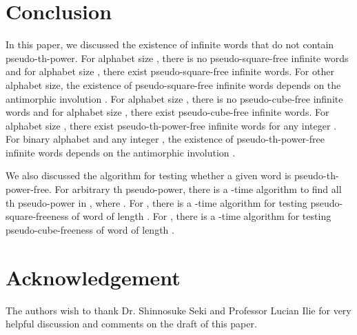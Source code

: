 \documentclass[12pt]{article}
\begin{document}
\section{Conclusion}\label{section:conclusion}
In this paper, we discussed the existence of infinite words that do
not contain pseudo-th-power. For alphabet size , there is
no pseudo-square-free infinite words and for alphabet size ,
there exist pseudo-square-free infinite words. For other alphabet
size, the existence of pseudo-square-free infinite words depends on
the antimorphic involution . For alphabet size , there
is no pseudo-cube-free infinite words and for alphabet size , there exist pseudo-cube-free infinite words. For alphabet size
, there exist pseudo-th-power-free infinite words for any
integer . For binary alphabet and any integer ,
the existence of pseudo-th-power-free infinite words depends on
the antimorphic involution .


We also discussed the algorithm for testing whether a given word 
is pseudo-th-power-free. For arbitrary th pseudo-power, there
is a -time algorithm to find all th pseudo-power in
, where . For , there is a -time algorithm
for testing pseudo-square-freeness of word  of length . For
, there is a -time algorithm for testing
pseudo-cube-freeness of word  of length .



\section*{Acknowledgement}
The authors wish to thank Dr. Shinnosuke Seki and Professor Lucian
Ilie for very helpful discussion and comments on the draft of this
paper.
\end{document}
